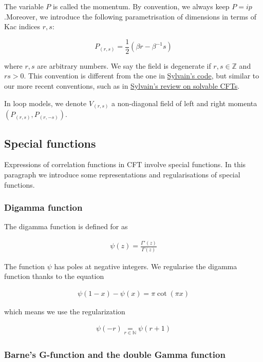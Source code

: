 \documentclass[a4paper]{article}
\numberwithin{equation}{section}
\begin{document}
The variable \(P\) is called the momentum. By convention, we always keep \(P=ip\).Moreover, we introduce the following parametrisation of dimensions in terms of Kac indices \(r, s\):

\[P_{(r,s)}=\frac{1}{2}(\beta r - \beta^{-1}s)\]

where \(r,s\) are arbitrary numbers. We say the field is degenerate if \(r,s\in \mathbb Z\) and \(rs > 0\).
This convention is different from the one in \href{https://gitlab.com/s.g.ribault/Bootstrap\_Virasoro.git}{Sylvain's code}, but similar to our more recent conventions, such as in \href{https://github.com/ribault/CFT-Review}{Sylvain's review on solvable CFTs}.

In loop models, we denote \(V_{(r,s)}\) a non-diagonal field of left and right momenta \((P_{(r,s)},P_{(r,-s)})\).
\subsection{Special functions}
\label{sec:org8205ee0}

Expressions of correlation functions in CFT involve special functions. In this paragraph we introduce some representations and regularisations of special functions.
\subsubsection*{Digamma function}
\label{sec:orgfd503a6}

The digamma function is defined for as

\begin{align}
  \psi(z) = \frac{\Gamma'(z)}{\Gamma(z)}
\end{align}

The function \(\psi\) has poles at negative integers. We regularise the digamma function thanks to the equation

\begin{align}
  \psi(1-x) - \psi(x) = \pi \operatorname{cot}(\pi x)
\end{align}

which means we use the regularization

\begin{align}
  \psi(-r) \underset{r\in\mathbb{N}}{=} \psi(r+1)
\end{align}
\subsubsection*{Barne's G-function and the double Gamma function}
\label{sec:org173abc3}
\end{document}
